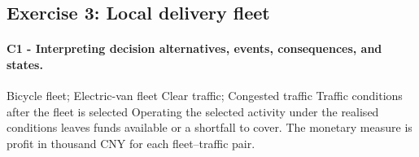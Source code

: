 	
	\newpage
	\subsection{Exercise 3: Local delivery fleet}
	\label{sec:problem3-local-delivery-fleet-c1-c2}
	
	\paragraph*{C1 - Interpreting decision alternatives, events, consequences, and states.}
	\label{subsec:problem3-local-delivery-fleet-c1}
	\DecisionElementsTable
{Bicycle fleet; Electric-van fleet}
{Clear traffic; Congested traffic}
{Traffic conditions after the fleet is selected}
{Operating the selected activity under the realised conditions leaves funds available or a shortfall to cover. The monetary measure is profit in thousand CNY for each fleet--traffic pair.}

	
	
